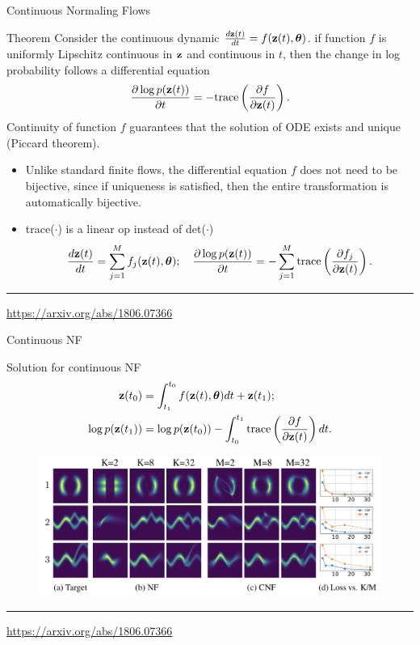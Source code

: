 \begin{frame}{Continuous Normaling Flows}
	\begin{block}{Theorem}
		Consider the continuous dynamic $\frac{d\mathbf{z}(t)}{dt} = f(\mathbf{z}(t), \boldsymbol{\theta})$. if function $f$ is uniformly Lipschitz continuous in $\mathbf{z}$ and continuous in $t$, then the change in log probability follows a differential equation
		\[
		\frac{\partial \log p(\mathbf{z}(t))}{\partial t} = - \text{trace} \left( \frac{\partial f}{\partial \mathbf{z}(t)} \right).
		\]
		\vspace{-0.1cm}
		Continuity of function $f$ guarantees that the solution of ODE exists and unique (Piccard theorem).
	\end{block}
	\begin{itemize}
		\item Unlike standard finite flows, the differential equation $f$ does not need to be bijective, since if
		uniqueness is satisfied, then the entire transformation is automatically bijective.
		\item trace($\cdot$) is a linear op instead of det($\cdot$)
		\vspace{-0.1cm}
		\[
		\frac{d\mathbf{z}(t)}{dt} = \sum_{j=1}^M f_j(\mathbf{z}(t), \boldsymbol{\theta}); \quad \frac{\partial \log p(\mathbf{z}(t))}{\partial t} = - \sum_{j=1}^M\text{trace} \left( \frac{\partial f_j}{\partial \mathbf{z}(t)} \right).
		\]
	\end{itemize}
	\vfill
	\hrule\medskip
	{\scriptsize \href{https://arxiv.org/abs/1806.07366}{https://arxiv.org/abs/1806.07366}} 
\end{frame}
\begin{frame}{Continuous NF}
	\begin{block}{Solution for continuous NF}
		\vspace{-0.3cm}
	\begin{align*}
		\mathbf{z}(t_0) &= \int_{t_1}^{t_0} f(\mathbf{z}(t), \boldsymbol{\theta}) dt + \mathbf{z}(t_1); \\
	    \log p(\mathbf{z}(t_1)) &= \log p(\mathbf{z}(t_0)) - \int_{t_0}^{t_1} \text{trace} \left( \frac{\partial f}{\partial \mathbf{z}(t)} \right) dt.
	\end{align*}
	\end{block}
	\vspace{-0.3cm}
	\begin{figure}
	    \centering
	    \includegraphics[width=1\linewidth]{figs/cnf}
	\end{figure}
	\vfill
	\hrule\medskip
	{\scriptsize \href{https://arxiv.org/abs/1806.07366}{https://arxiv.org/abs/1806.07366}} 
\end{frame}
